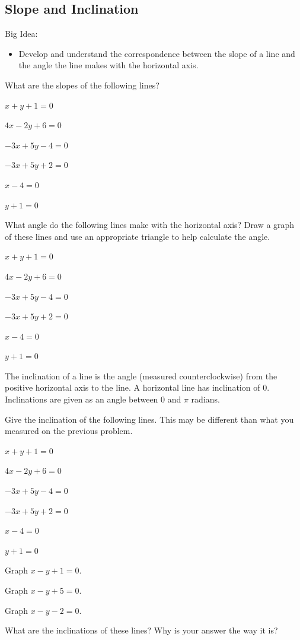\subsection{Slope and Inclination}
Big Idea:
\begin{itemize}
\item Develop and understand the correspondence between the slope of a line and the angle the line makes with the horizontal axis.
\end{itemize}
\bq What are the slopes of the following lines?
\be
\item $x+y+1=0$
\item $4x-2y+6=0$
\item $-3x+5y-4=0$
\item $-3x+5y+2=0$
\item $x-4=0$
\item $y+1=0$
\ee
\eq

\bq What angle do the following lines make with the horizontal axis? Draw a graph of these lines and use an appropriate triangle to help calculate the angle.
\be
\item $x+y+1=0$
\item $4x-2y+6=0$
\item $-3x+5y-4=0$
\item $-3x+5y+2=0$
\item $x-4=0$
\item $y+1=0$
\ee
\eq

\begin{info} The inclination of a line is the angle (measured counterclockwise) from the positive horizontal axis to the line. A horizontal line has inclination of $0$. Inclinations are given as an angle between $0$ and $\pi$ radians. \end{info}

\bq Give the inclination of the following lines. This may be different than what you measured on the previous problem.
\be
\item $x+y+1=0$
\item $4x-2y+6=0$
\item $-3x+5y-4=0$
\item $-3x+5y+2=0$
\item $x-4=0$
\item $y+1=0$
\ee
\eq

\bq \be
\item Graph $x-y+1=0$.
\item Graph $x-y+5=0$.
\item Graph $x-y-2=0$.
\item What are the inclinations of these lines? Why is your answer the way it is?
\ee \eq

